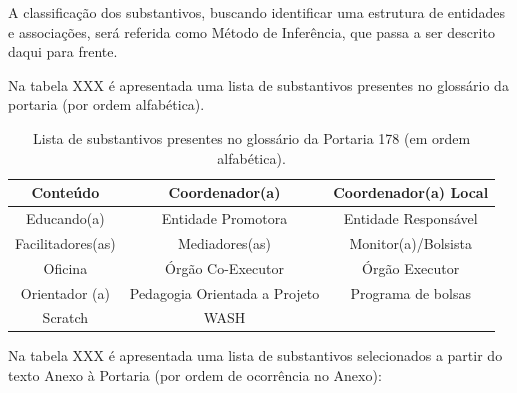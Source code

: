 \documentclass[
12pt,		%
openright,	%
twoside,  %
a4paper,			%
chapter=TITLE,		%
english,			%
french,				%
spanish,			%
brazil				%
]{USPSC-classe/USPSC}
\begin{document}
A classifica\c{c}\~ao dos substantivos, buscando identificar uma estrutura de entidades e associa\c{c}\~oes, ser\'a referida como \textquotedbl M\'etodo de Infer\^encia\textquotedbl , que passa a ser descrito daqui para frente.














Na tabela XXX \'e apresentada uma lista de substantivos presentes no gloss\'ario da portaria (por ordem alfab\'etica).


















\begin{table}[htb]
\tiny
\caption{\label{851a1e52af25f74c678bf17c26eb1854f2e97387}Lista de substantivos presentes no gloss\'ario da Portaria 178 (em ordem alfab\'etica).}

\centering
\begin{tabular}{|c|c|c|}
\hline
Conte\'udo  &  Coordenador(a)  &  Coordenador(a) Local \\
\hline
Educando(a)  &  Entidade Promotora  &  Entidade Respons\'avel \\
\hline
Facilitadores(as)  &  Mediadores(as)  &  Monitor(a)/Bolsista \\
\hline
Oficina  &  \'Org\~ao Co-Executor  &  \'Org\~ao Executor \\
\hline
Orientador (a)  &  Pedagogia Orientada a Projeto  & Programa de bolsas \\
\hline
Scratch  &  WASH  &  \\
\hline
\end{tabular}
\end{table}


Na tabela XXX \'e apresentada uma lista de substantivos selecionados a partir do texto Anexo \`a Portaria (por ordem de ocorr\^encia no Anexo):
\end{document}

